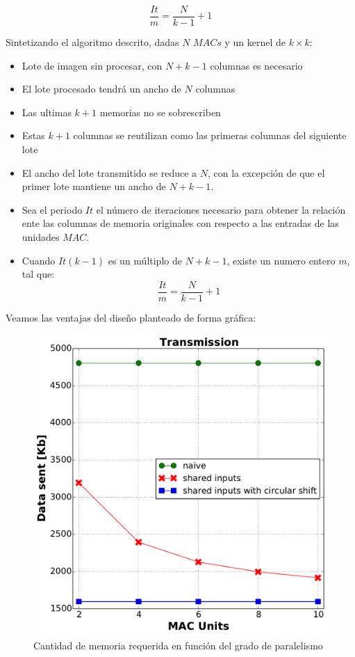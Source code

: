 \begin{equation}\label{niter}
  \frac{It}{m} = \frac{N}{k-1} + 1
\end{equation}

Sintetizando el algoritmo descrito, dadas $N$ $MACs$ y  un kernel de $ k \times k$:

\begin{itemize}
\item Lote de imagen sin procesar,  con $N+k-1$ columnas es necesario
	\item El lote procesado tendrá un ancho de $N$ columnas
	\item Las ultimas $k+1$ memorias no se sobrescriben
	\item Estas $k+1$ columnas se reutilizan como las primeras columnas del siguiente lote
	\item El ancho del lote transmitido se reduce a $N$, con la excepción de que el primer lote mantiene un ancho de $N+k-1$.
	\item Sea el periodo $It$  el número de iteraciones necesario para obtener la relación ente las columnas de memoria originales con respecto a las entradas de las unidades $MAC$.
	\item Cuando $It(k-1)$ es un múltiplo de $N+k-1$, existe un numero entero $m$, tal que:
\begin{equation}
  \frac{It}{m} = \frac{N}{k-1} + 1
\end{equation}
\end{itemize}

Veamos las ventajas del diseño planteado de forma gráfica:

\begin{figure}
\centering
\includegraphics[scale=0.5]{data_sent}
\caption{Cantidad de memoria requerida en función del grado de paralelismo }
\label{memoryrequired}
\end{figure}

